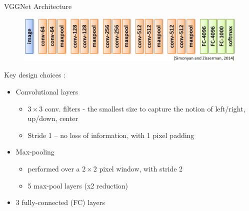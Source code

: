 \documentclass{beamer}
\begin{document}
	 
		

	\begin{frame}{VGGNet Architecture}%
			\begin{figure}
            \centering
            \includegraphics[width=0.8\linewidth]{figures/vggnet_single.jpg}
        \end{figure}
	\footnotesize
	Key design choices :  
	\begin{itemize}
	\item Convolutional layers
	\begin{itemize}
	\item  $3\times3$ conv. filters - the smallest size to capture the notion of left/right, up/down, center
	\item  Stride 1 – no loss of information, with  1 pixel padding
	\end{itemize}
	\item Max-pooling
	\begin{itemize}
	\item  performed over a  $2\times2$ pixel window, with stride 2
	\item 5 max-pool layers (x2 reduction)
	\end{itemize}  
	\item 3 fully-connected (FC) layers 
	\end{itemize}   
	\end{frame}
\end{document}
